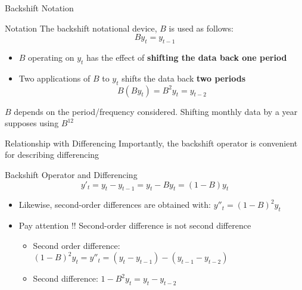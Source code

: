 \documentclass{beamer}
\begin{document}
\begin{frame}{Backshift Notation}

  \begin{block}{Notation}
    The backshift notational device, $B$ is used as follows:\\

    \begin{equation*}
      B y_t = y_{t-1}
    \end{equation*}
  \end{block}

    
    \begin{itemize}
    \item   $B$ operating on $y_t$ has the effect of \textbf{shifting the data back one period}
    \item   Two applications of $B$ to $y_t$ shifts the data back \textbf{two periods}
      \begin{equation*}
        B(By_t) = B^2 y_t = y_{t-2}
      \end{equation*}
    \end{itemize}
    
$B$ depends on the period/frequency considered. Shifting monthly data by a year supposes using $B^{12}$

\end{frame}


\begin{frame}{Relationship with Differencing}
  Importantly, the backshift operator is convenient for describing differencing\\

  \medskip
  
  \begin{exampleblock}{Backshift Operator and Differencing}
    $$y'_t = y_t - y_{t-1} = y_t - By_t = (1-B)y_t$$
  \end{exampleblock}


  \begin{itemize}
    \item Likewise, second-order differences are obtained with: $y''_t = (1-B)^2y_t$  
    \item Pay attention !! Second-order difference is not second difference 
      \begin{itemize}
      \item Second order difference: $(1-B)^2 y_t = y''_t = (y_t - y_{t-1}) - (y_{t-1} - y_{t-2})$
      \item Second difference: $1-B^2 y_t = y_t - y_{t-2}$
      \end{itemize}
  \end{itemize}
  
\end{frame}
\end{document}
